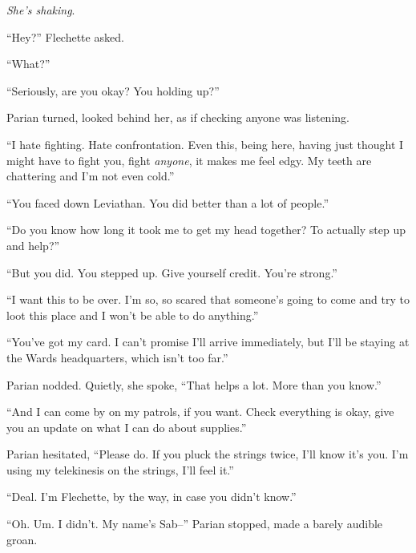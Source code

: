 \emph{She's shaking}.



``Hey?'' Flechette asked.



``What?''



``Seriously, are you okay?  You holding up?''



Parian turned, looked behind her, as if checking anyone was listening.



``I hate fighting.  Hate confrontation.  Even this, being here, having just thought I might have to fight you, fight \emph{anyone}, it makes me feel edgy.  My teeth are chattering and I'm not even cold.''



``You faced down Leviathan.  You did better than a lot of people.''



``Do you know how long it took me to get my head together?  To actually step up and help?''



``But you did.  You stepped up.  Give yourself credit.  You're strong.''



``I want this to be over.  I'm so, so scared that someone's going to come and try to loot this place and I won't be able to do anything.''



``You've got my card.  I can't promise I'll arrive immediately, but I'll be staying at the Wards headquarters, which isn't too far.''



Parian nodded.  Quietly, she spoke, ``That helps a lot.  More than you know.''



``And I can come by on my patrols, if you want.  Check everything is okay, give you an update on what I can do about supplies.''



Parian hesitated, ``Please do.  If you pluck the strings twice, I'll know it's you.  I'm using my telekinesis on the strings, I'll feel it.''



``Deal.  I'm Flechette, by the way, in case you didn't know.''



``Oh.  Um.  I didn't.  My name's Sab--'' Parian stopped, made a barely audible groan.



